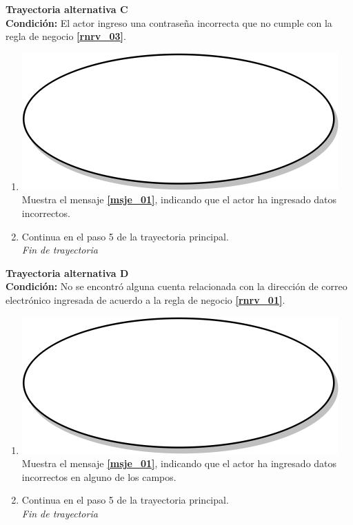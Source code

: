 \textbf{Trayectoria alternativa C} \label{cu1_ta_c}\\
\textbf{Condición:} El actor ingreso una contraseña incorrecta que no cumple con la regla de negocio \textbf{\ref{rnrv_03}}.\\
 \begin{enumerate}[label=C\arabic*]
    \item {\includegraphics[scale=.05]{Capitulo3/img/proceso.png} Muestra el mensaje \textbf{\ref{msje_01}}, indicando que el actor ha ingresado datos incorrectos.}
    \item {Continua en el paso 5 de la trayectoria principal.} \\
    \textit{Fin de trayectoria} \\
\end{enumerate}

\textbf{Trayectoria alternativa D} \label{cu1_ta_d}\\
\textbf{Condición:} No se encontró alguna cuenta relacionada con la dirección de correo electrónico ingresada de acuerdo a la regla de negocio \textbf{\ref{rnrv_01}}.\\
 \begin{enumerate}[label=D\arabic*]
    \item {\includegraphics[scale=.05]{Capitulo3/img/proceso.png} Muestra el mensaje \textbf{\ref{msje_01}}, indicando que el actor ha ingresado datos incorrectos en alguno de los campos.}
    \item {Continua en el paso 5 de la trayectoria principal.} \\
    \textit{Fin de trayectoria} \\
\end{enumerate}

